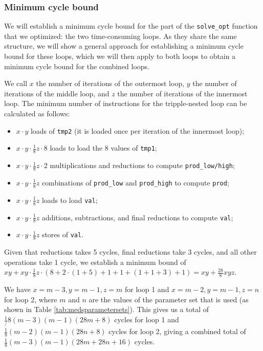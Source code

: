 \documentclass[11pt,a4paper]{report}
\theoremstyle{definition}
\begin{document}
\subsubsection{Minimum cycle bound}
We will establish a minimum cycle bound for the part of the \texttt{solve\_opt} function that we optimized: the two time-consuming loops. As they share the same structure, we will show a general approach for establishing a minimum cycle bound for these loops, which we will then apply to both loops to obtain a minimum cycle bound for the combined loops.

We call $x$ the number of iterations of the outermost loop, $y$ the number of iterations of the middle loop, and $z$ the number of iterations of the innermost loop. The minimum number of instructions for the tripple-nested loop can be calculated as follows:
\begin{itemize}
  \item $x \cdot y$ loads of \texttt{tmp2} (it is loaded once per iteration of the innermost loop);
  \item $x \cdot y \cdot \frac{1}{8}z \cdot 8$ loads to load the 8 values of \texttt{tmp1};
  \item $x \cdot y \cdot \frac{1}{8}z \cdot 2$ multiplications and reductions to compute \texttt{prod\_low/high};
  \item $x \cdot y \cdot \frac{1}{8}z$ combinations of \texttt{prod\_low} and \texttt{prod\_high} to compute \texttt{prod};
  \item $x \cdot y \cdot \frac{1}{8}z$ loads to load \texttt{val};
  \item $x \cdot y \cdot \frac{1}{8}z$ additions, subtractions, and final reductions to compute \texttt{val};
  \item $x \cdot y \cdot \frac{1}{8}z$ stores of \texttt{val}.
\end{itemize}
Given that reductions takes 5 cycles, final reductions take 3 cycles, and all other operations take 1 cycle, we establish a minimum bound of $xy + xy \cdot \frac{1}{8}z \cdot (8 + 2 \cdot (1 + 5) + 1 + 1 + (1 + 1 + 3) + 1) = xy + \frac{28}{8}xyz$.

We have $x = m - 3, y = m - 1, z = m$ for loop 1 and $x = m - 2, y = m - 1, z = n$ for loop 2, where $m$ and $n$ are the values of the parameter set that is used (as shown in Table \ref{tab:medsparametersets}). This gives us a total of $\frac{1}/{8}(m-3)(m-1)(28m + 8)$ cycles for loop 1 and $\frac{1}{8}(m-2)(m-1)(28n + 8)$ cycles for loop 2, giving a combined total of $\frac{1}{8}(m-3)(m-1)(28m + 28n + 16)$ cycles.
\end{document}
